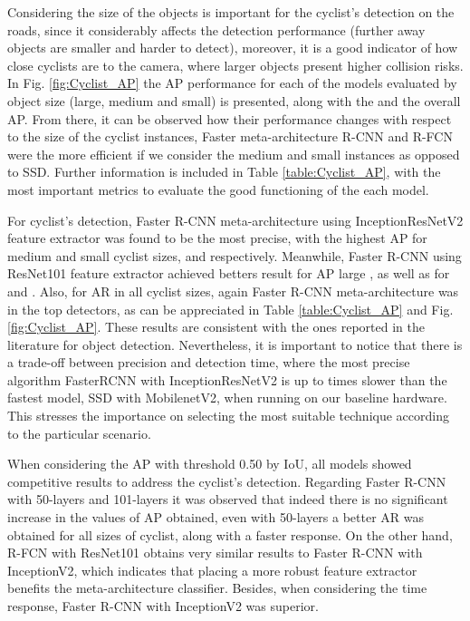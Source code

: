 \documentclass[journal]{IEEEtran}
\begin{document}
Considering the size of the objects is important for the cyclist's detection on the roads, since it considerably affects the detection performance (further away objects are smaller and harder to detect), moreover, it is a good indicator of how close cyclists are to the camera, where larger objects present  higher collision risks. In Fig. \ref{fig:Cyclist_AP} the AP performance for each of the models evaluated by object size (large, medium and small) is presented, along with the  and the overall AP. From there, it can be observed how their performance changes with respect to the size of the cyclist instances, Faster meta-architecture R-CNN and R-FCN were the more efficient if we consider the medium and small instances as opposed to SSD. Further information is included in Table  \ref{table:Cyclist_AP}, with the most important metrics to evaluate the good functioning of the each model. 

For cyclist's detection, Faster R-CNN meta-architecture using InceptionResNetV2 feature extractor was found to be the most precise, with the highest AP for medium and small cyclist sizes,  and  respectively. Meanwhile, Faster R-CNN using ResNet101 feature extractor achieved betters result for AP large , as well as for  and . Also, for AR in all cyclist sizes, again Faster R-CNN meta-architecture was in the top detectors, as can be appreciated in Table \ref{table:Cyclist_AP} and Fig. \ref{fig:Cyclist_AP}. These results are consistent with the ones reported in the literature for object detection. Nevertheless, it is important to notice that there is a trade-off between precision and detection time, where the most precise algorithm FasterRCNN with InceptionResNetV2 is up to  times slower than the fastest model, SSD with MobilenetV2, when running on our baseline hardware. This stresses the importance on selecting the most suitable technique according to the particular scenario. 

When considering the AP with threshold 0.50 by IoU, all models showed competitive results to address the cyclist's detection. Regarding Faster R-CNN with 50-layers and 101-layers it was observed that indeed there is no significant increase in the values of AP obtained, even with 50-layers a better AR was obtained for all sizes of cyclist, along with a faster response. On the other hand, R-FCN with ResNet101 obtains very similar results to Faster R-CNN with InceptionV2, which indicates that placing a more robust feature extractor benefits the meta-architecture classifier. Besides, when considering the time response, Faster R-CNN with InceptionV2 was superior.
\end{document}
